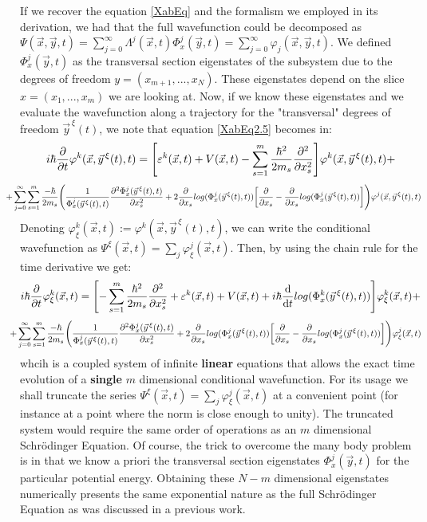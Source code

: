 \documentclass[11pt, a4paper]{article} %
\begin{document}
If we recover the equation \eqref{XabEq} and the formalism we employed in its derivation, we had that the full wavefunction could be decomposed as $\Psi(\vec{x},\vec{y},t)=\sum_{j=0}^\infty\Lambda^j(\vec{x},t)\Phi^j_x(\vec{y},t)=\sum_{j=0}^\infty \varphi_j(\vec{x},\vec{y},t)$. We defined $\Phi^j_x(\vec{y},t)$ as the transversal section eigenstates of the subsystem due to the degrees of freedom $y=(x_{m+1},...,x_N)$. These eigenstates depend on the slice $x=(x_1,...,x_m)$ we are looking at. Now, if we know these eigenstates and we evaluate the wavefunction along a trajectory for the "transversal" degrees of freedom $\vec{y}^{\, \xi}(t)$, we note that equation \eqref{XabEq2.5} becomes in:
\begin{equation}
 i\hbar\pdv{}{t}\varphi^k(\vec{x},\vec{y}^{\, \xi}(t),t)=\qty[ \varepsilon^k(\vec{x},t)+V(\vec{x},t)  -\sum_{s=1}^m\frac{\hbar^2}{2m_s}\pdv[2]{}{x_s} ]\varphi^k(\vec{x},\vec{y}^{\, \xi}(t),t)+
\end{equation}
$$
\hspace{-0.6cm}+\sum_{j=0}^\infty\sum_{s=1}^m \frac{-\hbar}{2m_s}\qty( \frac{1}{\Phi^j_x(\vec{y}^{\, \xi}(t),t)}\pdv[2]{\Phi^j_x(\vec{y}^{\, \xi}(t),t)}{x_s}+2\pdv{}{x_s}log(\Phi^j_x(\vec{y}^{\, \xi}(t),t))\qty[\pdv{}{x_s}-\pdv{}{x_s}log(\Phi^j_x(\vec{y}^{\, \xi}(t),t))] )\varphi^j(\vec{x},\vec{y}^{\, \xi}(t),t)
$$
Denoting $\varphi^k_\xi(\vec{x},t):=\varphi^k(\vec{x},\vec{y}^{\, \xi}(t),t)$, we can write the conditional wavefunction as $\Psi^\xi(\vec{x},t)=\sum_j \varphi^j_\xi(\vec{x},t)$. Then, by using the chain rule for the time derivative we get:
\begin{equation}\label{XabEq3}
 i\hbar\pdv{}{t}\varphi^k_\xi(\vec{x},t)=\qty[-\sum_{s=1}^m\frac{\hbar^2}{2m_s}\pdv[2]{}{x_s}+ \varepsilon^k(\vec{x},t)+V(\vec{x},t)   +i\hbar \dv{}{t}log(\Phi^k_x(\vec{y}^{\, \xi}(t),t))]\varphi^k_\xi(\vec{x},t)+
\end{equation}
$$
\hspace{-0.4cm}+\sum_{j=0}^\infty\sum_{s=1}^m \frac{-\hbar}{2m_s}\qty( \frac{1}{\Phi^j_x(\vec{y}^{\, \xi}(t),t)}\pdv[2]{\Phi^j_x(\vec{y}^{\, \xi}(t),t)}{x_s}+2\pdv{}{x_s}log(\Phi^j_x(\vec{y}^{\, \xi}(t),t))\qty[\pdv{}{x_s}-\pdv{}{x_s}log(\Phi^j_x(\vec{y}^{\, \xi}(t),t))] )\varphi^j_\xi(\vec{x},t)
$$
whcih is a coupled system of infinite {\bf linear} equations that allows the exact time evolution of a {\bf single} $m$ dimensional conditional wavefunction. For its usage we shall truncate the series $\Psi^\xi(\vec{x},t)=\sum_j \varphi^j_\xi(\vec{x},t)$ at a convenient point (for instance at a point where the norm is close enough to unity). The truncated system would require the same order of operations as an $m$ dimensional Schrödinger Equation. Of course, the trick to overcome the many body problem is in that we know a priori the transversal section eigenstates $\Phi^j_x(\vec{y},t)$ for the particular potential energy. Obtaining these $N-m$ dimensional eigenstates numerically presents the same exponential nature as the full Schrödinger Equation as was discussed in a previous work.
\end{document}
